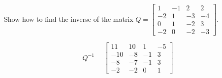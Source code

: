 
\begin{exerciseStatement}


Show how to find the inverse of the matrix \(Q= \left[\begin{array}{cccc}
1 & -1 & 2 & 2 \\
-2 & 1 & -3 & -4 \\
0 & 1 & -2 & 3 \\
-2 & 0 & -2 & -3
\end{array}\right] \).


\end{exerciseStatement}
    
\begin{exerciseAnswer} 
\[Q^{-1}= \left[\begin{array}{cccc}
11 & 10 & 1 & -5 \\
-10 & -8 & -1 & 3 \\
-8 & -7 & -1 & 3 \\
-2 & -2 & 0 & 1
\end{array}\right] \]
\end{exerciseAnswer}
    
